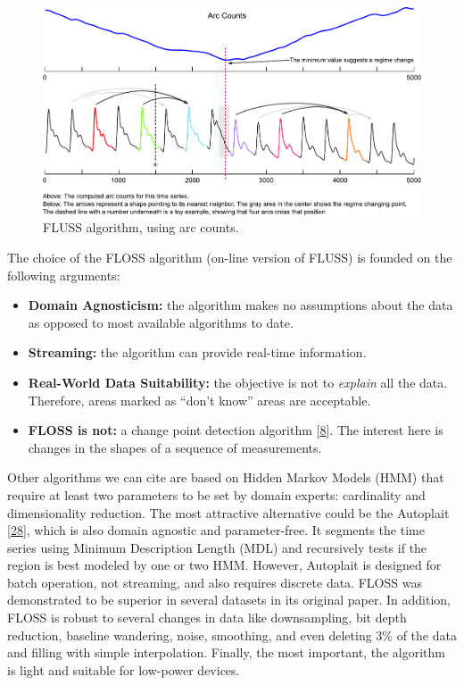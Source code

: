 \documentclass[runningheads]{llncs}
\providecommand{\tightlist}{%
  \setlength{\itemsep}{0pt}\setlength{\parskip}{0pt}}
\begin{document}
\begin{figure}

{\centering \includegraphics[width=1\linewidth]{../../docs/figure/fluss_arcs} 

}

\caption{FLUSS algorithm, using arc counts.}\label{fig:arcsoriginal}
\end{figure}

The choice of the FLOSS algorithm (on-line version of FLUSS) is founded on the following arguments:

\begin{itemize}
\tightlist
\item
  \textbf{Domain Agnosticism:} the algorithm makes no assumptions about the data as opposed to most
  available algorithms to date.
\item
  \textbf{Streaming:} the algorithm can provide real-time information.
\item
  \textbf{Real-World Data Suitability:} the objective is not to \emph{explain} all the data. Therefore, areas
  marked as ``don't know'' areas are acceptable.
\item
  \textbf{FLOSS is not:} a change point detection algorithm {[}\protect\hyperlink{ref-aminikhanghahi2016}{8}{]}. The interest here is
  changes in the shapes of a sequence of measurements.
\end{itemize}

Other algorithms we can cite are based on Hidden Markov Models (HMM) that require at least two
parameters to be set by domain experts: cardinality and dimensionality reduction. The most
attractive alternative could be the Autoplait {[}\protect\hyperlink{ref-Matsubara2014}{28}{]}, which is also domain agnostic and
parameter-free. It segments the time series using Minimum Description Length (MDL) and recursively
tests if the region is best modeled by one or two HMM. However, Autoplait is designed for batch
operation, not streaming, and also requires discrete data. FLOSS was demonstrated to be superior in
several datasets in its original paper. In addition, FLOSS is robust to several changes in data like
downsampling, bit depth reduction, baseline wandering, noise, smoothing, and even deleting 3\% of the
data and filling with simple interpolation. Finally, the most important, the algorithm is light and
suitable for low-power devices.
\end{document}
